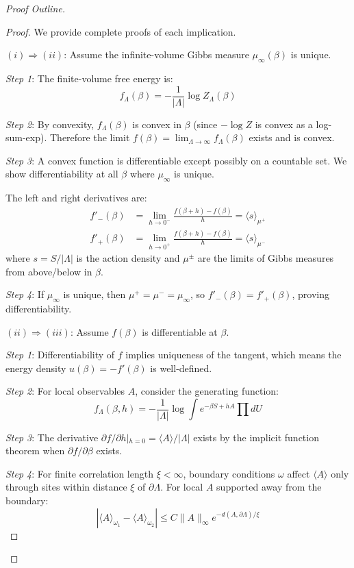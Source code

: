 \begin{proof}[Proof Outline]
\begin{proof}
We provide complete proofs of each implication.

\textbf{$(i) \Rightarrow (ii)$}: Assume the infinite-volume Gibbs measure 
$\mu_\infty(\beta)$ is unique.

\textit{Step 1}: The finite-volume free energy is:
\[
f_\Lambda(\beta) = -\frac{1}{|\Lambda|} \log Z_\Lambda(\beta)
\]

\textit{Step 2}: By convexity, $f_\Lambda(\beta)$ is convex in $\beta$ 
(since $-\log Z$ is convex as a log-sum-exp). Therefore the limit 
$f(\beta) = \lim_{\Lambda \to \infty} f_\Lambda(\beta)$ exists and is convex.

\textit{Step 3}: A convex function is differentiable except possibly on a 
countable set. We show differentiability at all $\beta$ where $\mu_\infty$ is unique.

The left and right derivatives are:
\begin{align*}
f'_-(\beta) &= \lim_{h \to 0^-} \frac{f(\beta+h) - f(\beta)}{h} = \langle s \rangle_{\mu^+} \\
f'_+(\beta) &= \lim_{h \to 0^+} \frac{f(\beta+h) - f(\beta)}{h} = \langle s \rangle_{\mu^-}
\end{align*}
where $s = S/|\Lambda|$ is the action density and $\mu^{\pm}$ are the limits 
of Gibbs measures from above/below in $\beta$.

\textit{Step 4}: If $\mu_\infty$ is unique, then $\mu^+ = \mu^- = \mu_\infty$, 
so $f'_-(\beta) = f'_+(\beta)$, proving differentiability.

\textbf{$(ii) \Rightarrow (iii)$}: Assume $f(\beta)$ is differentiable at $\beta$.

\textit{Step 1}: Differentiability of $f$ implies uniqueness of the tangent, 
which means the energy density $u(\beta) = -f'(\beta)$ is well-defined.

\textit{Step 2}: For local observables $A$, consider the generating function:
\[
f_\Lambda(\beta, h) = -\frac{1}{|\Lambda|} \log \int e^{-\beta S + h A} \prod dU
\]

\textit{Step 3}: The derivative $\partial f / \partial h |_{h=0} = \langle A \rangle / |\Lambda|$ 
exists by the implicit function theorem when $\partial f / \partial \beta$ exists.

\textit{Step 4}: For finite correlation length $\xi < \infty$, boundary 
conditions $\omega$ affect $\langle A \rangle$ only through sites within 
distance $\xi$ of $\partial \Lambda$. For local $A$ supported away from 
the boundary:
\[
|\langle A \rangle_{\omega_1} - \langle A \rangle_{\omega_2}| \leq C \|A\|_\infty e^{-d(A, \partial\Lambda)/\xi}
\]


\end{proof}
\end{proof}
